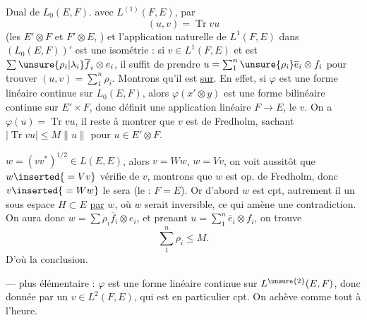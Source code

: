 Dual de $L_0(E,F)$.   avec $L^{(1)}(F,E)$,  par
\[
\boxed{(u,v)=\operatorname{Tr}vu}
\]
(les $E'\otimes F$ et $F'\otimes E$, )
et l'application naturelle de $L^1(F,E)$ dans $(L_0(E,F))'$ est une isométrie : si $v\in L^1(F,E)$ et est $\sum\unsure{\rho_i|\lambda_i}\overline f_i\otimes e_i$, il suffit de prendre $u=\sum_1^n\unsure{\rho_i}\overline e_i\otimes f_i$ pour trouver $(u,v)=\sum_1^n\rho_i$.
Montrons qu'il est \uline{sur}. En effet, si $\varphi$ est une forme linéaire continue sur $L_0(E,F)$, alors $\varphi(x'\otimes y)$ est une forme bilinéaire continue sur $E'\times F$, donc définit une application linéaire $F\longrightarrow E$,  le $v$. On a $\varphi(u)=\operatorname{Tr}vu$, il reste à montrer que $v$ est de Fredholm, sachant $|\operatorname{Tr}vu|\leq M\|u\|$ pour $u\in E'\otimes F$.


$w=(vv^*)^{1/2}\in L(E,E)$, alors $v=Ww$, $w=Vv$, on voit aussitôt que $w\inserted{{}=Vv}$  vérifie  de $v$, montrons que $w$ est op. de Fredholm, donc $v\inserted{{}=Ww}$ le sera (le  : $F=E$).
Or  d'abord $w$ est cpt,  autrement il  un sous espace $H\subset E$ \uline{}  \uline{par}  $w$, où $w$ serait inversible, ce qui amène une contradiction.
On aura donc $w=\sum\rho_i\overline f_i\otimes e_i$, et prenant $u=\sum_1^n\overline e_i\otimes f_i$, on trouve
\[
\sum_1^n\rho_i\leq M.
\]
D'où la conclusion.

---   plus élémentaire : $\varphi$ est une forme linéaire continue sur $L^{\unsure{2}}(E,F)$, donc donnée par un $v\in L^2(F,E)$, qui est en particulier cpt. On achève comme tout à l'heure.
